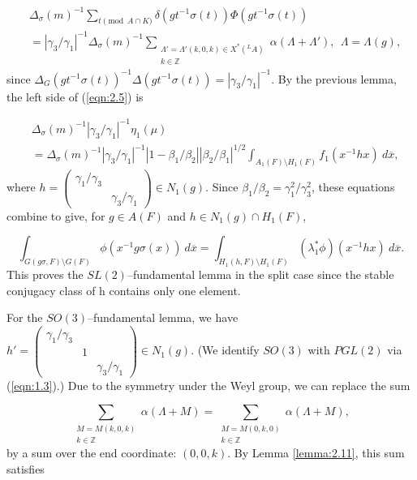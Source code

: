 \documentclass[12pt,letterpaper]{article}
\def\zzz{\mathbb{Z}}
\def\ovx{\overline{x}}
\begin{document}
\[
\begin{split}
&\Delta_{\sigma}(m)^{-1}\sum_{t \pmod{A\cap K}}
\delta (gt^{-1}\sigma (t))\Phi (gt^{-1}\sigma (t))\\
&=|\gamma_3/\gamma_1|^{-1}\Delta_{\sigma}(m)^{-1}
\sum_{\substack{\Lambda ' =\Lambda '(k,0,k)\in X^*(^{L}A) \\ k\in\zzz}}
\alpha (\Lambda +\Lambda '),\ \ \Lambda =\Lambda (g),
\end{split}
\]
since
$\Delta_G(gt^{-1}\sigma (t))^{-1}\Delta (gt^{-1}\sigma (t))
=|\gamma_3/\gamma_1|^{-1}$. By the previous lemma, the left side of
(\ref{eqn:2.5}) is

\[
\begin{split}
&\Delta_{\sigma}(m)^{-1}|\gamma_3/\gamma_1|^{-1}\eta_1 (\mu )\\
&=\Delta_{\sigma}(m)^{-1}|\gamma_3/\gamma_1|^{-1}
|1-\beta_1/\beta_2||\beta_2/\beta_1|^{1/2}
\int_{A_1(F)\setminus H_1(F)} f_1(x^{-1}hx)\ d\ovx ,
\end{split}
\]
where $h = 
\left( \begin{array}{cc} 
\gamma_1/\gamma_3&\ \\
 \ &\gamma_3/\gamma_1\end{array}
\right) \in N_1(g).$
Since
$\beta_1/\beta_2 = \gamma_1^2/\gamma_3^2$, these equations combine to give, for
$g\in A(F)$ and $h\in N_1(g)\cap H_1(F)$,

\begin{equation}
\label{eqn:2.12}
 \int_{G(g\sigma ,F)\setminus G(F)} \phi (x^{-1}g\sigma (x))\ d\ovx
 =\int_{H_1(h,F)\setminus H_1(F)}
(\lambda_1^*\phi )(x^{-1}hx)\ d\ovx .
\end{equation}
This proves the $SL(2)$--fundamental lemma
in the split case since the stable conjugacy class of h contains only
one element.
 
For the $SO(3)$--fundamental lemma, we have $h' = \left(
\begin{array}{ccc}  \gamma_1/\gamma_3&\ &\ \\
 \ &1&\ \\
 \ &\ &\gamma_3/\gamma_1\end{array}\right) \in N_1(g)$.
(We identify $SO(3)$ with $PGL(2)$ via (\ref{eqn:1.3}).)
Due to the symmetry under the Weyl group, we can replace the sum

\[
\sum_{\substack{M=M(k,0,k)\\k\in \zzz }}
\alpha (\Lambda +M)
=\sum_{\substack{ M=M(0,k,0)\\k\in \zzz }}
\alpha (\Lambda +M),
\]
by a sum over the end coordinate: $(0,0,k)$. By Lemma \ref{lemma:2.11}, 
this sum satisfies
\end{document}
